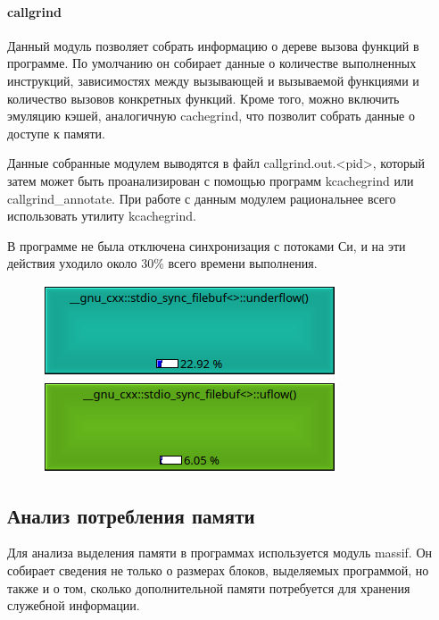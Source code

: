 \documentclass[12pt]{article}
\begin{document}
\paragraph{callgrind}

Данный модуль позволяет собрать информацию о дереве вызова функций в программе. По умолчанию он собирает данные о количестве выполненных инструкций, зависимостях между вызывающей и вызываемой функциями и количество вызовов конкретных функций. Кроме того, можно включить эмуляцию кэшей, аналогичную cachegrind, что позволит собрать данные о доступе к памяти.

Данные собранные модулем выводятся в файл callgrind.out.<pid>, который затем может быть проанализирован с помощью программ kcachegrind или callgrind\_annotate.
При работе с данным модулем рациональнее всего использовать утилиту kcachegrind.

В программе не была отключена синхронизация с потоками Си, и на эти действия уходило около 30\% всего времени выполнения.

\begin{figure}[ht]
	\centering
\includegraphics[scale=0.9]{underflow.png}
\includegraphics[scale=0.9]{Screenshot_20181117_002314.png}

\end{figure}


\subsection*{Анализ потребления памяти}

Для анализа выделения памяти в программах используется модуль massif. Он собирает сведения не только о размерах блоков, выделяемых программой, но также и о том, сколько дополнительной памяти потребуется для хранения служебной информации.
\end{document}
